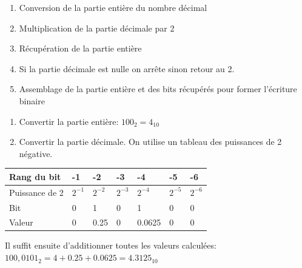 \bigskip

\def\level{Première}  %
\def\course{NSI}
\def\chaptername{Représentation des flottants} %
\def\docname{RD04-S}        %

\makeheader{} %

	\begin{methode}{}
	\begin{enumerate}
	\item Conversion de la partie entière du nombre décimal
	\item Multiplication de la partie décimale par 2
	\item Récupération de la partie entière 
	\item Si la partie décimale est nulle on arrête sinon retour au 2.
	\item Assemblage de la partie entière et des bits récupérés pour former l'écriture binaire
\end{enumerate}
	\end{methode}

	\begin{methode}{}

\begin{enumerate}
	\item Convertir la partie entière: $100_2=4_{10}$
	\item Convertir la partie décimale. On utilise un tableau des puissances de 2 négative.
\end{enumerate}

	
\renewcommand{\arraystretch}{1.3}
\begin{tabular}{|p{2.6cm}|p{1.3cm}|p{1.3cm}|p{1.3cm}|p{1.3cm}|p{1.3cm}|p{1.3cm}|}
\hline
Rang du bit & -1 & -2 & -3 & -4 & -5 & -6  \\ \hline
Puissance de 2 & $2^{-1}$ & $2^{-2}$ & $2^{-3}$ & $2^{-4}$ & $2^{-5}$ & $2^{-6}$  \\ \hline
Bit & 0 & 1 & 0 & 1 & 0 & 0  \\ \hline
Valeur & 0 & 0.25  & 0  & 0.0625 & 0 & 0 \\ \hline

\end{tabular}


\medskip

Il suffit ensuite d'additionner toutes les valeurs calculées: $100,0101_2=4+0.25+0.0625=4.3125_{10}$

\end{methode}
